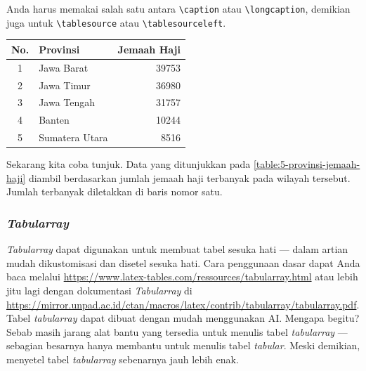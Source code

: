 \begin{enumerate}[label=\alph*.]
    Anda harus memakai salah satu antara \verb|\caption| atau \verb|\longcaption|, demikian juga untuk \verb|\tablesource| atau \verb|\tablesourceleft|.
    
    \begin{table}[H]
        \centering
        \label{table:5-provinsi-jemaah-haji}
        \begin{tabular}{c l r}
            \hline
            No. & Provinsi & Jemaah Haji \\
            \hline
            1 & Jawa Barat & 39753 \\
            2 & Jawa Timur & 36980 \\
            3 & Jawa Tengah & 31757 \\
            4 & Banten & 10244 \\
            5 & Sumatera Utara & 8516 \\
            \hline
        \end{tabular}
    \end{table}
    
    Sekarang kita coba tunjuk. Data yang ditunjukkan pada \autoref{table:5-provinsi-jemaah-haji} diambil berdasarkan jumlah jemaah haji terbanyak pada wilayah tersebut. Jumlah terbanyak diletakkan di baris nomor satu.
\end{enumerate}

\subsubsection{\textit{Tabularray}}

\textit{Tabularray} dapat digunakan untuk membuat tabel sesuka hati --- dalam artian mudah dikustomisasi dan disetel sesuka hati. Cara penggunaan dasar dapat Anda baca melalui \url{https://www.latex-tables.com/ressources/tabularray.html} atau lebih jitu lagi dengan dokumentasi \textit{Tabularray} di \url{https://mirror.unpad.ac.id/ctan/macros/latex/contrib/tabularray/tabularray.pdf}. Tabel \textit{tabularray} dapat dibuat dengan mudah menggunakan AI. Mengapa begitu? Sebab masih jarang alat bantu yang tersedia untuk menulis tabel \textit{tabularray} --- sebagian besarnya hanya membantu untuk menulis tabel \textit{tabular}. Meski demikian, menyetel tabel \textit{tabularray} sebenarnya jauh lebih enak.

